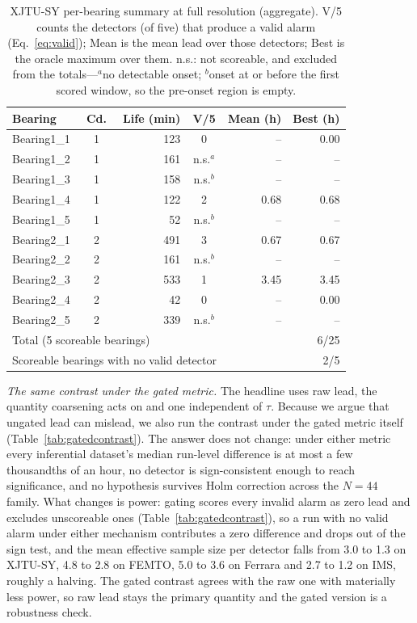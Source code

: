 \documentclass[IJPHM, 2026, 0]{PHMSociety}
\begin{document}
\begin{table}[t] \small
	\begin{center}
	\caption{XJTU-SY per-bearing summary at full resolution (aggregate). V/5 counts the detectors (of five) that produce a valid alarm (Eq.~\ref{eq:valid}); Mean is the mean lead over those detectors; Best is the oracle maximum over them. n.s.: not scoreable, and excluded from the totals---$^a$no detectable onset; $^b$onset at or before the first scored window, so the pre-onset region is empty.}
	\label{tab:perbearing}
	\setlength{\tabcolsep}{3.5pt}
	\begin{tabular}{l c r c r r}
		\hline \hline
		\textbf{Bearing} & \textbf{Cd.} & \textbf{Life (min)} & \textbf{V/5} & \textbf{Mean (h)} & \textbf{Best (h)} \\
		\hline
		Bearing1\_1 & 1 & 123 & 0 & -- & 0.00 \\
		Bearing1\_2 & 1 & 161 & n.s.$^a$ & -- & -- \\
		Bearing1\_3 & 1 & 158 & n.s.$^b$ & -- & -- \\
		Bearing1\_4 & 1 & 122 & 2 & 0.68 & 0.68 \\
		Bearing1\_5 & 1 & 52 & n.s.$^b$ & -- & -- \\
		Bearing2\_1 & 2 & 491 & 3 & 0.67 & 0.67 \\
		Bearing2\_2 & 2 & 161 & n.s.$^b$ & -- & -- \\
		Bearing2\_3 & 2 & 533 & 1 & 3.45 & 3.45 \\
		Bearing2\_4 & 2 & 42 & 0 & -- & 0.00 \\
		Bearing2\_5 & 2 & 339 & n.s.$^b$ & -- & -- \\
		\hline
		\multicolumn{4}{l}{Total (5 scoreable bearings)} & \multicolumn{2}{r}{6/25} \\
		\multicolumn{4}{l}{Scoreable bearings with no valid detector} & \multicolumn{2}{r}{2/5} \\
		\hline \hline
	\end{tabular}
	\end{center}
\end{table}

\emph{The same contrast under the gated metric.} The headline uses raw lead, the quantity coarsening acts on and one independent of $\tau$. Because we argue that ungated lead can mislead, we also run the contrast under the gated metric itself (Table~\ref{tab:gatedcontrast}). The answer does not change: under either metric every inferential dataset's median run-level difference is at most a few thousandths of an hour, no detector is sign-consistent enough to reach significance, and no hypothesis survives Holm correction across the $N=44$ family. What changes is power: gating scores every invalid alarm as zero lead and excludes unscoreable ones (Table~\ref{tab:gatedcontrast}), so a run with no valid alarm under either mechanism contributes a zero difference and drops out of the sign test, and the mean effective sample size per detector falls from 3.0 to 1.3 on XJTU-SY, 4.8 to 2.8 on FEMTO, 5.0 to 3.6 on Ferrara and 2.7 to 1.2 on IMS, roughly a halving. The gated contrast agrees with the raw one with materially less power, so raw lead stays the primary quantity and the gated version is a robustness check.
\end{document}
